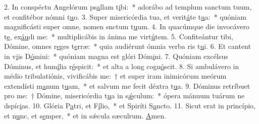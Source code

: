 2. In conspéctu Angelórum ps\uline{a}llam t\uline{i}bi:~* adorábo ad templum sanctum tuum, et confitébor nómni t\uline{u}o.
3. Super misericórdia tua, et verit\uline{á}te t\uline{u}a:~* quóniam magnificásti super omne, nomen snctum t\uline{u}um.
4. In quacúmque die invocávero t\uline{e}, ex\uline{áu}di me:~* multiplicábis in ánima me virt\uline{ú}tem.
5. Confiteántur tibi, Dómine, omnes r\uline{e}ges t\uline{e}rræ:~* quia audiérunt ómnia verba ris t\uline{u}i.
6. Et cantent in v\uline{i}is D\uline{ó}mini:~* quóniam magna est glóri Dóm\uline{i}ni.
7. Quóniam excélsus Dóminus, et hum\uline{í}lia r\uline{é}spicit:~* et alta a long cogn\uline{ó}scit.
8. Si ambulávero in médio tribulatiónis, vivificábis me:~† et super iram inimicórum meórum extendísti m\uline{a}num t\uline{u}am,~* et salvum me fecit déxtra t\uline{u}a.
9. Dóminus retríbuet pro me:~† Dómine, misericórdia t\uline{u}a in s\uline{ǽ}culum:~* ópera mánuum tuárum ne dspíc\uline{i}as.
10. Glória P\uline{a}tri, et F\uline{í}lio,~* et Spiríti S\uline{a}ncto.
11. Sicut erat in princípio, et n\uline{u}nc, et s\uline{e}mper,~* et in sǽcula sæculrum. \uline{A}men.
